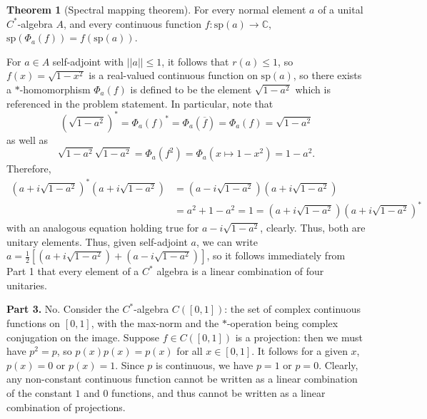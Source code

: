 \documentclass[aps,pra,showpacs,notitlepage,onecolumn,superscriptaddress,nofootinbib]{revtex4-1}
\theoremstyle{definition}
\newtheorem{theorem}{Theorem}[section]
\begin{document}
\begin{theorem}[Spectral mapping theorem]
  \label{thm:spectral}
  For every normal element $a$ of a unital $C^{*}$-algebra $A$, and every continuous function $f : \text{sp}(a) \rightarrow \mathbb{C}$, $\text{sp}(\Phi_a(f)) = f(\text{sp}(a))$.
\end{theorem}
\noindent For $a \in A$ self-adjoint with $||a|| \leq 1$, it follows that $r(a) \leq 1$, so $f(x) = \sqrt{1 - x^2}$ is a real-valued continuous function on $\text{sp}(a)$, so there exists
a $*$-homomorphism $\Phi_a(f)$ is defined to be the element $\sqrt{1 - a^2}$ which is referenced in the problem statement. In particular, note that
\begin{equation}
 \left(  \sqrt{1 - a^2} \right)^{*} = \Phi_a(f)^{*} = \Phi_{a}(\overline{f}) = \Phi_a(f) = \sqrt{1 - a^2}
\end{equation}
as well as
\begin{equation}
  \sqrt{1 - a^2} \sqrt{1 - a^2} = \Phi_a(f^2) = \Phi_a(x \mapsto 1 - x^2) = 1 - a^2.
\end{equation}
Therefore,
\begin{align}
  \left(a + i \sqrt{1 - a^2}\right)^{*} \left(a + i \sqrt{1 - a^2}\right) &=  \left(a - i \sqrt{1 - a^2}\right) \left(a + i \sqrt{1 - a^2}\right) \\ &= a^2 + 1 - a^2 = 1 = \left(a + i \sqrt{1 - a^2}\right) \left(a + i \sqrt{1 - a^2}\right)^{*}
\end{align}
with an analogous equation holding true for $a - i \sqrt{1 - a^2}$, clearly. Thus, both are unitary elements. Thus, given self-adjoint $a$, we can write $a = \frac{1}{2} \left[ \left(a + i\sqrt{1 - a^2}\right) + \left(a - i\sqrt{1 - a^2}\right) \right]$,
so it follows immediately from Part 1 that every element of a $C^{*}$ algebra is a linear combination of four unitaries.
\newline

\noindent \textbf{Part 3.} No. Consider the $C^{*}$-algebra $C([0, 1])$: the set of complex continuous functions on $[0, 1]$, with the max-norm and the $*$-operation being complex conjugation on the image. Suppose $f \in C([0, 1])$
is a projection: then we must have $p^2 = p$, so $p(x) p(x) = p(x)$ for all $x \in [0, 1]$. It follows for a given $x$, $p(x) = 0$ or $p(x) = 1$. Since $p$ is continuous, we have $p = 1$ or $p = 0$. Clearly, any non-constant continuous
function cannot be written as a linear combination of the constant $1$ and $0$ functions, and thus cannot be written as a linear combination of projections.
\end{document}
